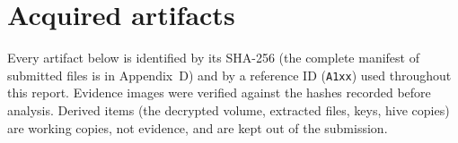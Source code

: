 \documentclass[11pt,a4paper,final,oneside]{article}
\begin{document}
\clearpage


\section{Acquired artifacts}
\label{sec:artifacts}

Every artifact below is identified by its SHA-256 (the complete manifest of submitted files is in Appendix~D) and by a reference ID (\texttt{A1xx}) used throughout this report. Evidence images were verified against the hashes recorded before analysis. Derived items (the decrypted volume, extracted files, keys, hive copies) are working copies, not evidence, and are kept out of the submission.
\end{document}
